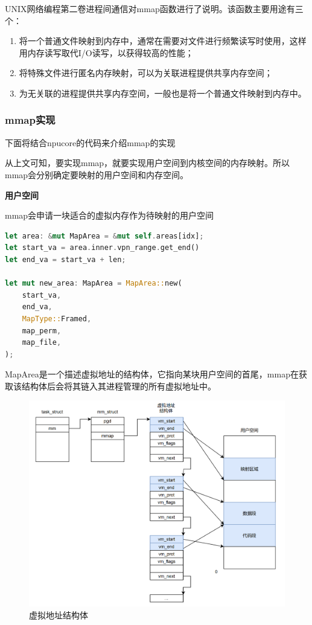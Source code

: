 UNIX网络编程第二卷进程间通信对mmap函数进行了说明。该函数主要用途有三个：
\begin{enumerate}
    \item 将一个普通文件映射到内存中，通常在需要对文件进行频繁读写时使用，这样用内存读写取代I/O读写，以获得较高的性能；
    \item 将特殊文件进行匿名内存映射，可以为关联进程提供共享内存空间；
    \item 为无关联的进程提供共享内存空间，一般也是将一个普通文件映射到内存中。
\end{enumerate}

\subsubsection{mmap实现}
下面将结合npucore的代码来介绍mmap的实现

从上文可知，要实现mmap，就要实现用户空间到内核空间的内存映射。所以mmap会分别确定要映射的用户空间和内存空间。

\textbf{用户空间}

mmap会申请一块适合的虚拟内存作为待映射的用户空间
\begin{lstlisting}[language={Rust},
	caption={os/src/mm/memory_set.rs}]
let area: &mut MapArea = &mut self.areas[idx];
let start_va = area.inner.vpn_range.get_end()
let end_va = start_va + len;

let mut new_area: MapArea = MapArea::new(
    start_va,
    end_va,
    MapType::Framed,
    map_perm,
    map_file,
);
\end{lstlisting}
MapArea是一个描述虚拟地址的结构体，它指向某块用户空间的首尾，mmap在获取该结构体后会将其链入其进程管理的所有虚拟地址中。

\begin{figure}[H]
    \centering
    \caption[short]{虚拟地址结构体}
    \includegraphics[width=0.8\linewidth]{figures/09-04-mmap-虚拟地址结构体.png}
\end{figure}

